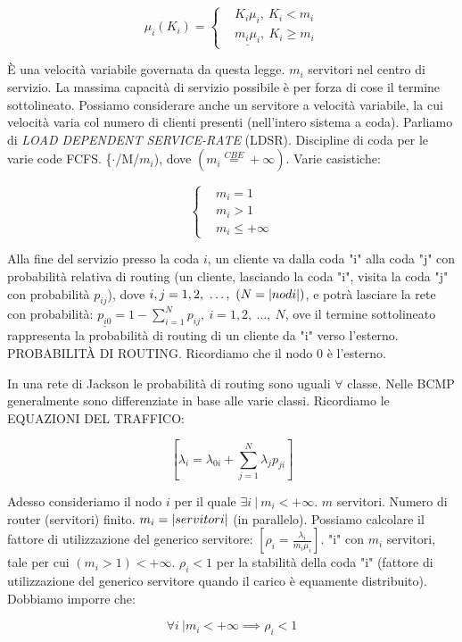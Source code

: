 \[
	\mu_i(K_i) = \left\{
	\begin{aligned}
	&K_i\mu_i,\ K_i<m_i\\
	&\underline{m_i\mu_i},\ K_i\geq m_i
	\end{aligned}
	\right.
\]

\`E una velocità variabile governata da questa legge. $m_i$ servitori nel centro di servizio. La massima capacità di servizio possibile è per forza di cose il termine sottolineato. Possiamo considerare anche un servitore a velocità variabile, la cui velocità varia col numero di clienti presenti (nell'intero sistema a coda). Parliamo di \textit{LOAD DEPENDENT SERVICE-RATE} (LDSR). Discipline di coda per le varie code FCFS. \{$\mathord{\cdot}$/M/$m_i$), dove $(m_i\stackrel{CBE}{=}+\infty)$. Varie casistiche:

\[
	\left\{
	\begin{aligned}
	&m_i = 1\\
	&m_i > 1\\
	&m_i \leq +\infty
	\end{aligned}
	\right.
\]

Alla fine del servizio presso la coda $i$, un cliente va dalla coda "i" alla coda "j" con probabilità relativa di routing (un cliente, lasciando la coda "i", visita la coda "j" con probabilità $p_{ij}$), dove $i,j=1,2,\ \dots,\ (N=\cardinality{nodi})$, e potrà lasciare la rete con probabilità: $\underline{p_{i0}} = 1-\sum_{i=1}^N{p_{ij}},\ i=1,2,\ \dots,\ N$, ove il termine sottolineato rappresenta la probabilità di routing di un cliente da "i" verso l'esterno. PROBABILIT\`A DI ROUTING. Ricordiamo che il nodo 0 è l'esterno.

In una rete di Jackson le probabilità di routing sono uguali $\forall$ classe. Nelle BCMP generalmente sono differenziate in base alle varie classi. Ricordiamo le EQUAZIONI DEL TRAFFICO:

\[
	[\lambda_i = \lambda_{0i} + \sum_{j=1}^N{\lambda_j}{p_{ji}}]
\]

Adesso consideriamo il nodo $i$ per il quale $\exists i\ |\ m_i<+\infty$. $m$ servitori. Numero di router (servitori) finito. $m_i=\left\vert{servitori}\right\vert$ (in parallelo). Possiamo calcolare il fattore di utilizzazione del generico servitore: $[\rho_i=\frac{\lambda_i}{m_i\mu_i}]$. "i" con $m_i$ servitori, tale per cui $(m_i>1)<+\infty$. $\rho_i<1$ per la stabilità della coda "i" (fattore di utilizzazione del generico servitore quando il carico è equamente distribuito). Dobbiamo imporre che:

\[
	\forall i\ | m_i<+\infty \implies \rho_i<1
\]

